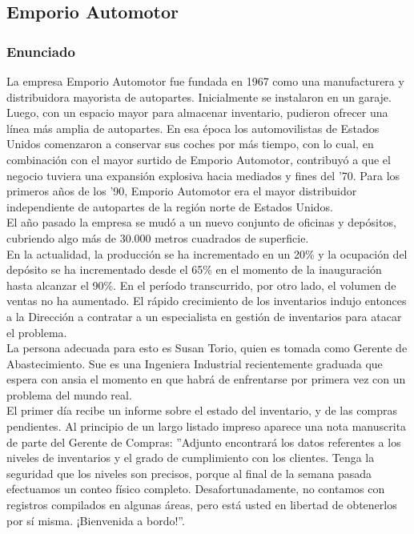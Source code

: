 \documentclass[a4paper,10pt,titlepage]{article}
\begin{document}
\newpage
\subsection{Emporio Automotor}

\subsubsection{Enunciado}

La empresa Emporio Automotor fue fundada en 1967 como una manufacturera y distribuidora mayorista de autopartes. Inicialmente se instalaron en un garaje. Luego, 
con un espacio mayor para almacenar inventario, pudieron ofrecer una l\' inea m\' as amplia de autopartes. En esa \'epoca los automovilistas de Estados Unidos 
comenzaron a conservar sus coches por m\'as tiempo, con lo cual, en combinaci\'on con el mayor surtido de Emporio Automotor, contribuy\'o a que el negocio tuviera una 
expansi\'on explosiva hacia mediados y fines del '70. Para los primeros años de los ’90, Emporio Automotor era el mayor distribuidor independiente de autopartes de 
la regi\'on norte de Estados Unidos.\\

El año pasado la empresa se mud\'o a un nuevo conjunto de oficinas y dep\'ositos, cubriendo algo más de 30.000 metros cuadrados de superficie.\\

En la actualidad, la producci\'on se ha incrementado en un 20\% y la ocupaci\'on del depósito se ha incrementado desde el 65\% en el momento de la inauguraci\'on 
hasta alcanzar el 90\%. En el per\'iodo transcurrido, por otro lado, el volumen de ventas no ha aumentado. El r\'apido crecimiento de los inventarios indujo 
entonces a la Direcci\'on a contratar a un especialista en gesti\'on de inventarios para atacar el problema.\\

La persona adecuada para esto es Susan Torio, quien es tomada como Gerente de Abastecimiento. Sue es una Ingeniera Industrial recientemente graduada que espera con 
ansia el momento en que habr\'a de enfrentarse por primera vez con un problema del mundo real.\\

El primer d\'ia recibe un informe sobre el estado del inventario, y de las compras pendientes. Al principio de un largo listado impreso aparece una nota manuscrita de 
parte del Gerente de Compras: ''Adjunto encontrar\'a los datos referentes a los niveles de inventarios y el grado de cumplimiento con los clientes. Tenga la seguridad 
que los niveles son precisos, porque al final de la semana pasada efectuamos un conteo físico completo. Desafortunadamente, no contamos con registros compilados en 
algunas áreas, pero est\'a usted en libertad de obtenerlos por s\'i misma. ¡Bienvenida a bordo!''.\\
\end{document}
